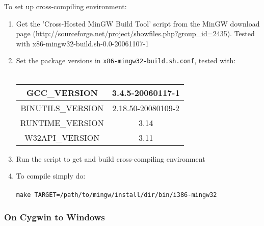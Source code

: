 \documentclass[a4paper,12pt,titlepage,dvipdfm]{article}
\begin{document}
To set up cross-compiling environment:                                                                                                                                                                                                   
\begin{enumerate}
%  
    \item Get the 'Cross-Hosted MinGW Build Tool' script from the MinGW download page (\url{http://sourceforge.net/project/showfiles.php?group_id=2435}). Tested with x86-mingw32-build.sh-0.0-20061107-1
    \item Set the package versions in \texttt{x86-mingw32-build.sh.conf}, tested with: \\
        \\
        \begin{tabular}{|c|c|}
            \hline
            GCC\_VERSION                   & 3.4.5-20060117-1\\
            \hline
            BINUTILS\_VERSION              & 2.18.50-20080109-2\\
            \hline
            RUNTIME\_VERSION               & 3.14\\
            \hline
            W32API\_VERSION                & 3.11\\
            \hline
        \end{tabular}
    \item Run the script to get and build cross-compiling environment
    \item To compile simply do: \\ \\ \texttt{make TARGET=/path/to/mingw/install/dir/bin/i386-mingw32}
\end{enumerate}
                                                                                                                                                                                                                                           
\subsubsection{On Cygwin to Windows}
                                                                                                                                                                                                                                           
\end{document}
